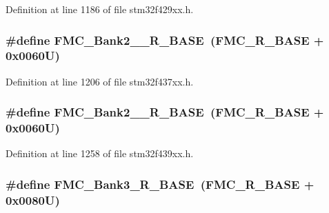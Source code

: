 Definition at line 1186 of file stm32f429xx.\+h.

\subsubsection[{\texorpdfstring{F\+M\+C\+\_\+\+Bank2\+\_\+3\+\_\+\+R\+\_\+\+B\+A\+SE}{FMC_Bank2_3_R_BASE}}]{\setlength{\rightskip}{0pt plus 5cm}\#define F\+M\+C\+\_\+\+Bank2\+\_\+\_\+\+R\+\_\+\+B\+A\+SE~({\bf F\+M\+C\+\_\+\+R\+\_\+\+B\+A\+SE} + 0x0060\+U)}\hypertarget{group___peripheral__memory__map_ga48c2af45e9b49fa719236a2e71d2f8b2}{}\label{group___peripheral__memory__map_ga48c2af45e9b49fa719236a2e71d2f8b2}


Definition at line 1206 of file stm32f437xx.\+h.

\subsubsection[{\texorpdfstring{F\+M\+C\+\_\+\+Bank2\+\_\+3\+\_\+\+R\+\_\+\+B\+A\+SE}{FMC_Bank2_3_R_BASE}}]{\setlength{\rightskip}{0pt plus 5cm}\#define F\+M\+C\+\_\+\+Bank2\+\_\+\_\+\+R\+\_\+\+B\+A\+SE~({\bf F\+M\+C\+\_\+\+R\+\_\+\+B\+A\+SE} + 0x0060\+U)}\hypertarget{group___peripheral__memory__map_ga48c2af45e9b49fa719236a2e71d2f8b2}{}\label{group___peripheral__memory__map_ga48c2af45e9b49fa719236a2e71d2f8b2}


Definition at line 1258 of file stm32f439xx.\+h.

\subsubsection[{\texorpdfstring{F\+M\+C\+\_\+\+Bank3\+\_\+\+R\+\_\+\+B\+A\+SE}{FMC_Bank3_R_BASE}}]{\setlength{\rightskip}{0pt plus 5cm}\#define F\+M\+C\+\_\+\+Bank3\+\_\+\+R\+\_\+\+B\+A\+SE~({\bf F\+M\+C\+\_\+\+R\+\_\+\+B\+A\+SE} + 0x0080\+U)}\hypertarget{group___peripheral__memory__map_gaf570671195a13f4bb2a1b8f2bd5305c9}{}\label{group___peripheral__memory__map_gaf570671195a13f4bb2a1b8f2bd5305c9}


